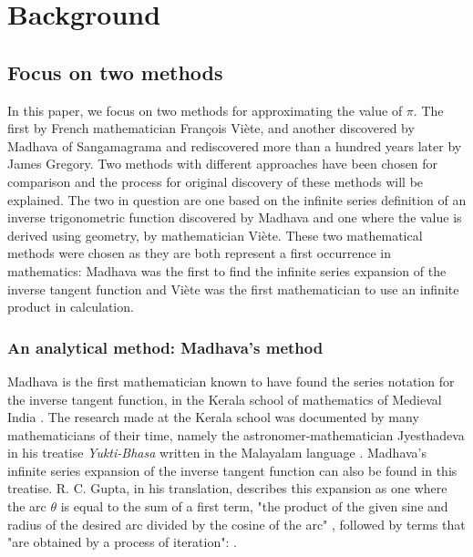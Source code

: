 \section{Background}

\subsection{Focus on two methods}

In this paper, we focus on two methods for approximating the value of $\pi$. 
The first by French mathematician François Viète, and another discovered by Madhava of Sangamagrama and 
rediscovered more than a hundred years later by James Gregory. Two methods with different 
approaches have been chosen for comparison and the process for original discovery of these methods
will be explained. The two in question are one based on 
the infinite series definition of an inverse trigonometric function discovered by Madhava
and one where the value is derived using geometry, by mathematician 
Viète. These two mathematical methods were chosen as they are both 
represent a first occurrence in mathematics: Madhava was the first to 
find the infinite series expansion of the inverse tangent function and Viète was 
the first mathematician to use an infinite product in calculation. 


\subsubsection{An analytical method: Madhava's method}

Madhava is the first mathematician known to have found the series notation for 
the inverse tangent function, in the Kerala school of mathematics of Medieval India 
\cite{amermathmonthly}. The research made at the Kerala school was documented by 
many mathematicians of their time, namely the astronomer-mathematician Jyesthadeva 
in his treatise \textit{Yukti-Bhasa} written in the Malayalam language \cite{oconnor_robertson_2000}. 
Madhava's infinite series expansion of the inverse tangent function can also be 
found in this treatise. R. C. Gupta, in his translation, describes this expansion as one 
where the arc $\theta$ is equal to the sum of a first term, "the product of the given sine 
and radius of the desired arc divided by the cosine of the arc" \footnotemark, followed by terms that "are 
obtained by a process of iteration": . \cite{rc_gupta_mgseries}



